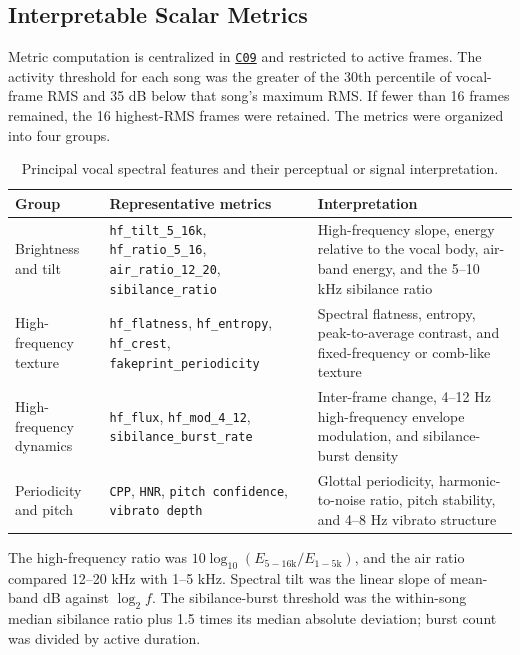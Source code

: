 \documentclass[11pt,a4paper]{article}
\newcommand{\coderef}[1]{\hyperlink{code:#1}{\texttt{#1}}}
\begin{document}
\subsection{Interpretable Scalar Metrics}

Metric computation is centralized in \coderef{C09} and restricted to active frames. The activity threshold for each song was the greater of the 30th percentile of vocal-frame RMS and 35 dB below that song's maximum RMS. If fewer than 16 frames remained, the 16 highest-RMS frames were retained. The metrics were organized into four groups.

\begin{table}[H]
\centering
\small
\caption{Principal vocal spectral features and their perceptual or signal interpretation.}
\label{tab:metrics}
\begin{tabularx}{\linewidth}{p{34mm}p{49mm}X}
\toprule
Group & Representative metrics & Interpretation \\
\midrule
Brightness and tilt & \texttt{hf\_tilt\_5\_16k}, \texttt{hf\_ratio\_5\_16}, \texttt{air\_ratio\_12\_20}, \texttt{sibilance\_ratio} & High-frequency slope, energy relative to the vocal body, air-band energy, and the 5--10 kHz sibilance ratio \\
High-frequency texture & \texttt{hf\_flatness}, \texttt{hf\_entropy}, \texttt{hf\_crest}, \texttt{fakeprint\_periodicity} & Spectral flatness, entropy, peak-to-average contrast, and fixed-frequency or comb-like texture \\
High-frequency dynamics & \texttt{hf\_flux}, \texttt{hf\_mod\_4\_12}, \texttt{sibilance\_burst\_rate} & Inter-frame change, 4--12 Hz high-frequency envelope modulation, and sibilance-burst density \\
Periodicity and pitch & \texttt{CPP}, \texttt{HNR}, \texttt{pitch confidence}, \texttt{vibrato depth} & Glottal periodicity, harmonic-to-noise ratio, pitch stability, and 4--8 Hz vibrato structure \\
\bottomrule
\end{tabularx}
\end{table}

The high-frequency ratio was $10\log_{10}(E_{5-16\mathrm{k}}/E_{1-5\mathrm{k}})$, and the air ratio compared 12--20 kHz with 1--5 kHz. Spectral tilt was the linear slope of mean-band dB against $\log_2 f$. The sibilance-burst threshold was the within-song median sibilance ratio plus 1.5 times its median absolute deviation; burst count was divided by active duration.
\end{document}
